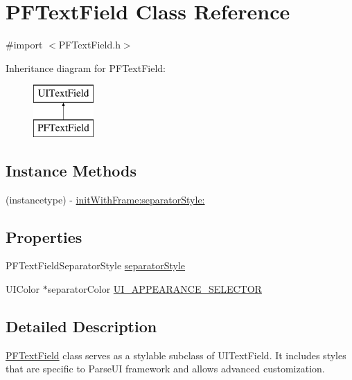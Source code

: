 \hypertarget{interface_p_f_text_field}{}\section{P\+F\+Text\+Field Class Reference}
\label{interface_p_f_text_field}


{\ttfamily \#import $<$P\+F\+Text\+Field.\+h$>$}

Inheritance diagram for P\+F\+Text\+Field\+:\begin{figure}[H]
\begin{center}
\leavevmode
\includegraphics[height=2.000000cm]{interface_p_f_text_field}
\end{center}
\end{figure}
\subsection*{Instance Methods}
\begin{DoxyCompactItemize}
\item 
(instancetype) -\/ \hyperlink{interface_p_f_text_field_a0f6fa8e4688219cd922809298cd69cb8}{init\+With\+Frame\+:separator\+Style\+:}
\end{DoxyCompactItemize}
\subsection*{Properties}
\begin{DoxyCompactItemize}
\item 
P\+F\+Text\+Field\+Separator\+Style \hyperlink{interface_p_f_text_field_a3ec60a43e08c7bff328c62d7a9038a50}{separator\+Style}
\item 
U\+I\+Color $\ast$separator\+Color \hyperlink{interface_p_f_text_field_a5c0195a8802ca92af06f63762a1093c0}{U\+I\+\_\+\+A\+P\+P\+E\+A\+R\+A\+N\+C\+E\+\_\+\+S\+E\+L\+E\+C\+T\+O\+R}
\end{DoxyCompactItemize}


\subsection{Detailed Description}
{\ttfamily \hyperlink{interface_p_f_text_field}{P\+F\+Text\+Field}} class serves as a stylable subclass of {\ttfamily U\+I\+Text\+Field}. It includes styles that are specific to {\ttfamily Parse\+U\+I} framework and allows advanced customization. 

